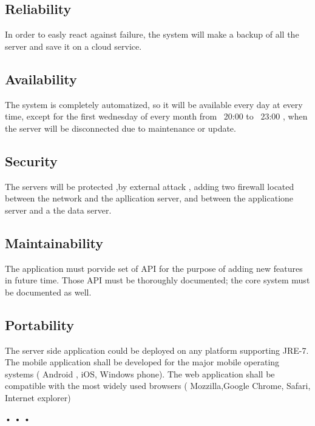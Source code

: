   \subsection{Reliability}
  In order to easly react against failure, the system will make a backup of all the server and save it on a cloud service.
  \subsection{Availability}
  The system is completely automatized, so it will be available every day at every time, except for the first wednesday of every month from ~20:00 to ~23:00 , when the server will be disconnected due to maintenance or update.
  \subsection{Security}
  The servers will be protected ,by external attack , adding two firewall located between the network and the apllication server, and between the applicatione server and a the data server.
  \subsection{Maintainability}
  The application must porvide set of API for the purpose of adding new features in future time.
  Those API must be thoroughly documented; the core system must be documented as well.
  \subsection{Portability}
  The server side application could be deployed on any platform supporting JRE-7.\\
  The mobile application shall be developed for the major mobile operating systems ( Android , iOS, Windows phone).
  The web application shall be compatible with the most widely used browsers ( Mozzilla,Google Chrome, Safari, Internet explorer) %
  
 • • •
                                                                                                                                                                                                                                                                                                                                                                                                                                                                                                                                                                                                                                                                                                                                                                                                                                                                                                                                                                                                                                                                                                                  
